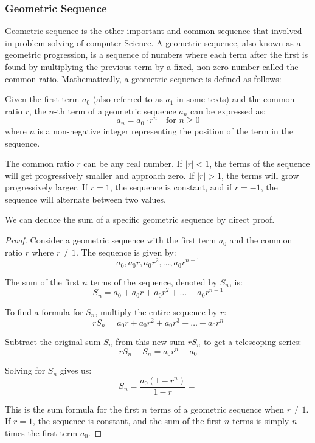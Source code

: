 \documentclass[
	12pt, %
	fleqn, %
	a4paper, %
]{LegrandOrangeBook}
\begin{document}
\subsubsection{Geometric Sequence}
Geometric sequence is the other important and common sequence that involved in problem-solving of computer
Science. 
A geometric sequence, also known as a geometric progression, is a sequence of numbers where each term after 
the first is found by multiplying the previous term by a fixed, non-zero number called the common ratio. 
Mathematically, a geometric sequence is defined as follows:
\begin{definition}
    Given the first term \( a_0 \) (also referred to as \( a_1 \) in some texts) and the common ratio \( r \), the \( n \)-th term of a geometric sequence \( a_n \) can be expressed as:
\[
a_n = a_0 \cdot r^n \quad \text{for } n \geq 0
\]
where \( n \) is a non-negative integer representing the position of the term in the sequence.
\end{definition}    

The common ratio \( r \) can be any real number. If \( |r| < 1 \), the terms of the sequence 
will get progressively smaller and approach zero. If \( |r| > 1 \), the terms will grow progressively 
larger. If \( r = 1 \), the sequence is constant, and if \( r = -1 \), the sequence will alternate 
between two values.

We can deduce the sum of a specific geometric sequence by direct proof.
\begin{theorem}
    
\end{theorem}

\begin{proof}
    Consider a geometric sequence with the first term \( a_0 \) and the common ratio \( r \) where \( r \neq 1 \). The sequence is given by:
\[ a_0, a_0r, a_0r^2, \ldots, a_0r^{n-1} \]

The sum of the first \( n \) terms of the sequence, denoted by \( S_n \), is:
\[ S_n = a_0 + a_0r + a_0r^2 + \ldots + a_0r^{n-1} \]

To find a formula for \( S_n \), multiply the entire sequence by \( r \):
\[ rS_n = a_0r + a_0r^2 + a_0r^3 + \ldots + a_0r^n \]

Subtract the original sum \( S_n \) from this new sum \( rS_n \) to get a telescoping series:
\[ rS_n - S_n = a_0r^n - a_0 \]

Solving for \( S_n \) gives us:
\[ S_n = \frac{a_0(1 - r^n)}{1 - r} = \]

This is the sum formula for the first \( n \) terms of a geometric sequence when \( r \neq 1 \). If \( r = 1 \), the sequence is constant, and the sum of the first \( n \) terms is simply \( n \) times the first term \( a_0 \).
\end{proof}
\end{document}
